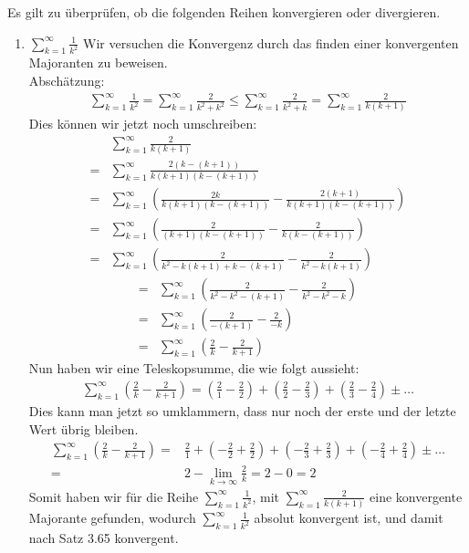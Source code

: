 \begin{lsg}%
Es gilt zu überprüfen, ob die folgenden Reihen konvergieren oder divergieren.
\begin{enumerate}[label=$\mathrm{(\roman*)}$, ref=$\mathrm{\roman*}$]
\item $\sum^{\infty}_{k=1}\frac{1}{k^2}$ Wir versuchen die Konvergenz durch das finden einer konvergenten Majoranten zu beweisen. \\
Abschätzung:
\begin{align*}
\sum^{\infty}_{k=1}\frac{1}{k^2} = \sum^{\infty}_{k=1}\frac{2}{k^2 + k^2} \leq \sum^{\infty}_{k=1}\frac{2}{k^2 + k} = \sum^{\infty}_{k=1}\frac{2}{k(k + 1)}
\end{align*}
Dies können wir jetzt noch umschreiben:
\begin{align*}
&\sum^{\infty}_{k=1}\frac{2}{k(k + 1)} \\
= & \sum^{\infty}_{k=1}\frac{2(k-(k+1))}{k(k + 1)(k-(k+1))} \\
= & \sum^{\infty}_{k=1}\left(\frac{2k}{k(k+1)(k-(k+1))}-\frac{2(k+1)}{k(k+1)(k-(k+1))}\right) \\
= & \sum^{\infty}_{k=1}\left(\frac{2}{(k+1)(k-(k+1))}-\frac{2}{k(k-(k+1))}\right) \\
= & \sum^{\infty}_{k=1}\left(\frac{2}{k^2-k(k+1)+k-(k+1)}-\frac{2}{k^2-k(k+1)}\right)
\end{align*}
\begin{align*}
= & \sum^{\infty}_{k=1}\left(\frac{2}{k^2-k^2-(k+1)}-\frac{2}{k^2-k^2-k}\right) \\
= & \sum^{\infty}_{k=1}\left(\frac{2}{-(k+1)}-\frac{2}{-k}\right) \\
= & \sum^{\infty}_{k=1}\left(\frac{2}{k}-\frac{2}{k+1}\right)
\end{align*}
Nun haben wir eine Teleskopsumme, die wie folgt aussieht:
\begin{align*}
\sum^{\infty}_{k=1}\left(\frac{2}{k}-\frac{2}{k+1}\right) = \left(\frac{2}{1} - \frac{2}{2}\right) + \left(\frac{2}{2} - \frac{2}{3}\right) + \left(\frac{2}{3} - \frac{2}{4}\right) \pm \ldots
\end{align*}
Dies kann man jetzt so umklammern, dass nur noch der erste und der letzte Wert übrig bleiben.
\begin{align*}
\sum^{\infty}_{k=1}\left(\frac{2}{k}-\frac{2}{k+1}\right) = &\frac{2}{1} + \left(-\frac{2}{2} + \frac{2}{2}\right) + \left(-\frac{2}{3} + \frac{2}{3}\right) + \left(-\frac{2}{4} + \frac{2}{4}\right) \pm \ldots \\
= & 2 - \lim_{k \to \infty}\frac{2}{k} = 2 - 0 = 2
\end{align*}
Somit haben wir für die Reihe $\sum^{\infty}_{k=1}\frac{1}{k^2}$, mit $\sum^{\infty}_{k=1}\frac{2}{k(k + 1)}$ eine konvergente Majorante gefunden, wodurch $\sum^{\infty}_{k=1}\frac{1}{k^2}$ absolut konvergent ist, und damit nach Satz 3.65 konvergent.


\end{enumerate}
\end{lsg}
